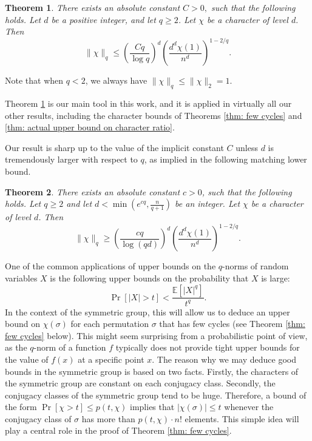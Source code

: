\documentclass[11pt, letterpaper]{amsart}
\newtheorem{thm}{Theorem}[section]
\renewcommand\ge{\geqslant}
\renewcommand\le{\leqslant}
\begin{document}
\begin{thm}\label{thm:main}
There exists an absolute constant $C>0,$ such that the following holds. 
Let $d$ be a positive integer, and let $q\ge 2$. Let $\chi$ be a character of level $d.$
Then 
\[
\| \chi \|_q \le \left( \frac{Cq}{\log q} \right)^d\left(\frac{d^d \chi(1)}{n^d}\right)^{1-2/q}. 
\]
\end{thm}
Note that when $q<2$, we always have $\|\chi\|_q\le \|\chi\|_2 = 1$.

Theorem \ref{thm:main} is our main tool in this work, and it is applied in virtually all our other results, including the character bounds of Theorems \ref{thm: few cycles} and \ref{thm: actual upper bound on character ratio}. %

Our result is sharp up to the value of the implicit constant $C$ unless $d$ is tremendously larger with respect to $q$, as implied in the following matching lower bound.

\begin{thm}\label{thm:matching lower bound for main}
There exists an absolute constant $c>0$, such that the following holds. Let $q\ge 2$ and let $d < \min(e^{cq},\frac{n}{q+1})$ be an integer. Let $\chi$ be a character of level $d$. Then  
\[
\| \chi\|_q \ge \left( \frac{cq}{\log (qd)} \right)^d\left(\frac{d^d \chi(1)}{n^d}\right)^{1-2/q}. 
\]
\end{thm}

One of the common applications of upper bounds on the $q$-norms of random variables $X$ is the following upper bounds on the probability that $X$ is large:
\[ 
\Pr[|X|>t]<\frac{\mathbb{E}[|X|^q]}{t^q}.
\]
In the context of the symmetric group, this will allow us to deduce an upper bound on $\chi(\sigma)$ for each permutation $\sigma$ that has few cycles (see Theorem \ref{thm: few cycles} below). This might seem surprising from a probabilistic point of view, as the $q$-norm of a function $f$ typically does not provide tight upper bounds for the value of $f(x)$ at a specific point $x$. The reason why we may deduce good bounds in the symmetric group is based on two facts. Firstly, the characters of the symmetric group are constant on each conjugacy class. Secondly, the conjugacy classes of the symmetric group tend to be huge. Therefore, a bound of the form  $\Pr[\chi >t] \le p(t,\chi)$ implies that $|\chi(\sigma)| \le t$ whenever the conjugacy class of $\sigma$ has more than $p(t,\chi)\cdot n!$ elements. This simple idea will play a central role in the proof of Theorem \ref{thm: few cycles}. 
\end{document}
